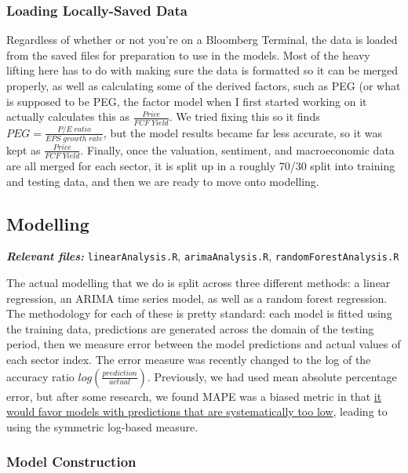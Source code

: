 \documentclass[]{article}
\begin{document}
\hypertarget{loading-locally-saved-data}{%
\subsubsection{Loading Locally-Saved
Data}\label{loading-locally-saved-data}}

Regardless of whether or not you're on a Bloomberg Terminal, the data is
loaded from the saved files for preparation to use in the models. Most
of the heavy lifting here has to do with making sure the data is
formatted so it can be merged properly, as well as calculating some of
the derived factors, such as PEG (or what is supposed to be PEG, the
factor model when I first started working on it actually calculates this
as \(\frac{Price}{FCF\; Yield}\). We tried fixing this so it finds
\(PEG=\frac{P/E\; ratio}{EPS\; growth\; rate}\), but the model results
became far less accurate, so it was kept as
\(\frac{Price}{FCF\; Yield}\). Finally, once the valuation, sentiment,
and macroeconomic data are all merged for each sector, it is split up in
a roughly 70/30 split into training and testing data, and then we are
ready to move onto modelling.

\hypertarget{modelling}{%
\subsection{Modelling}\label{modelling}}

\textbf{\emph{Relevant files:}} \texttt{linearAnalysis.R},
\texttt{arimaAnalysis.R}, \texttt{randomForestAnalysis.R}

The actual modelling that we do is split across three different methods:
a linear regression, an ARIMA time series model, as well as a random
forest regression. The methodology for each of these is pretty standard:
each model is fitted using the training data, predictions are generated
across the domain of the testing period, then we measure error between
the model predictions and actual values of each sector index. The error
measure was recently changed to the log of the accuracy ratio
\(log(\frac{prediction}{actual})\). Previously, we had used mean
absolute percentage error, but after some research, we found MAPE was a
biased metric in that
\href{https://papers.ssrn.com/sol3/papers.cfm?abstract_id=2635088}{it
would favor models with predictions that are systematically too low},
leading to using the symmetric log-based measure.

\hypertarget{model-construction}{%
\subsubsection{Model Construction}\label{model-construction}}
\end{document}
